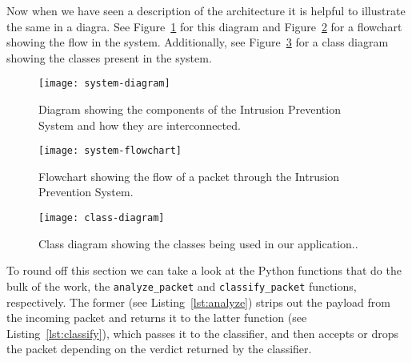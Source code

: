 \documentclass[10pt,journal,compsoc]{IEEEtran}
\begin{document}
Now when we have seen a description of the architecture it is helpful to illustrate the same in a diagra.
See Figure~\ref{fig:architecture} for this diagram and Figure~\ref{fig:flowchart} for a flowchart showing
the flow in the system. Additionally, see Figure~\ref{fig:classes} for a class diagram showing the
classes present in the system.

\begin{figure}
    \centering
        \texttt{[image: system-diagram]}
    \caption{Diagram showing the components of the Intrusion Prevention System and how they are interconnected.}
    \label{fig:architecture}
\end{figure}

\begin{figure}
    \centering
        \texttt{[image: system-flowchart]}
    \caption{Flowchart showing the flow of a packet through the Intrusion Prevention System.}
    \label{fig:flowchart}
\end{figure}

\begin{figure}
    \centering
        \texttt{[image: class-diagram]}
    \caption{Class diagram showing the classes being used in our application..}
    \label{fig:classes}
\end{figure}

To round off this section we can take a look at the Python functions that do the bulk of the work, the \verb|analyze_packet|
and \verb|classify_packet| functions, respectively. The former (see Listing~\ref{lst:analyze}) strips out the payload from the
incoming packet and returns it to the latter function (see Listing~\ref{lst:classify}), which passes it to the classifier, and then accepts or drops
the packet depending on the verdict returned by the classifier.
\end{document}
